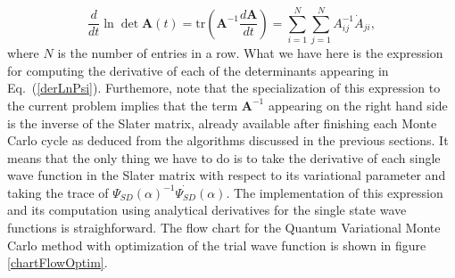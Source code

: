 \begin{equation}\label{derivativeSD}
 \boxed{\frac{d}{dt}\ln\det \mathbf A(t) = \mathrm{tr} \left(\mathbf A^{-1} \frac{d \mathbf{A}}{dt}\right) = \sum_{i=1}^{N} \sum_{j=1}^{N} A^{-1}_{ij} \dot{A}_{ji}},
\end{equation}
where $N$ is the number of entries in a row. What we have here is the expression for computing the derivative of each of the determinants appearing in Eq.~(\ref{derLnPsi}).  Furthemore, note that the specialization of this expression to the current problem implies that the term $\mathbf{A}^{-1}$ appearing on the right hand side is the inverse of the Slater matrix, already available after finishing each Monte Carlo cycle as deduced from the algorithms discussed in the previous sections. It means that the only thing we have to do is to take the derivative of each single wave function in the Slater matrix with respect to its variational parameter and taking the trace of $\Psi_{SD}(\alpha)^{-1} \dot{\Psi_{SD}}(\alpha)$. The implementation of this expression and its computation using analytical derivatives for the single state wave functions is straighforward. The flow chart for the Quantum Variational Monte Carlo method with optimization of the trial wave function is shown in figure \ref{chartFlowOptim}.

